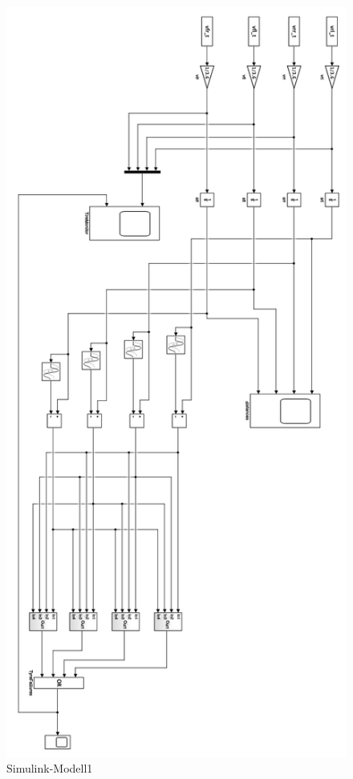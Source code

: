 \begin{figure}[h!]
	\centering
	\includegraphics[height=0.9\textheight]{../Graphiken/Simulink1}
	\caption{Simulink-Modell1}
	\label{fig:Simulink1}
\end{figure}

